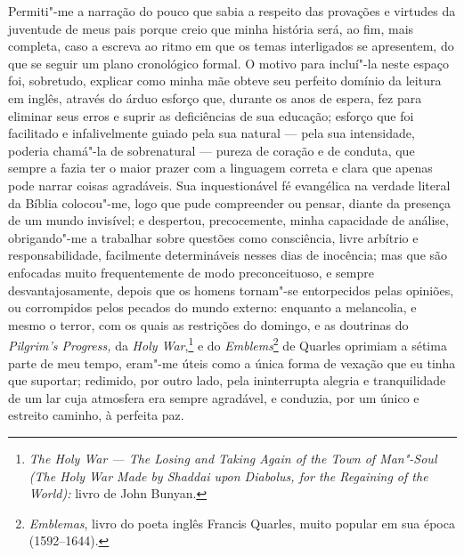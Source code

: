 Permiti"-me a narração do pouco que sabia a respeito das provações e
virtudes da juventude de meus pais porque creio que minha história será,
ao fim, mais completa, caso a escreva ao ritmo em que os temas
interligados se apresentem, do que se seguir um plano cronológico
formal. O motivo para incluí"-la neste espaço foi, sobretudo, explicar
como minha mãe obteve seu perfeito domínio da leitura em inglês, através
do árduo esforço que, durante os anos de espera, fez para eliminar seus
erros e suprir as deficiências de sua educação; esforço que foi
facilitado e infalivelmente guiado pela sua natural --- pela sua
intensidade, poderia chamá"-la de sobrenatural --- pureza de coração e de
conduta, que sempre a fazia ter o maior prazer com a linguagem correta e
clara que apenas pode narrar coisas agradáveis. Sua inquestionável fé
evangélica na verdade literal da Bíblia colocou"-me, logo que pude
compreender ou pensar, diante da presença de um mundo invisível; e
despertou, precocemente, minha capacidade de análise, obrigando"-me a
trabalhar sobre questões como consciência, livre arbítrio e
responsabilidade, facilmente determináveis nesses dias de inocência; mas
que são enfocadas muito frequentemente de modo preconceituoso, e sempre
desvantajosamente, depois que os homens tornam"-se entorpecidos pelas
opiniões, ou corrompidos pelos pecados do mundo externo: enquanto a
melancolia, e mesmo o terror, com os quais as restrições do domingo, e
as doutrinas do \textit{Pilgrim's Progress,} da \textit{Holy War},\footnote{\textit{The
  Holy War --- The Losing and Taking Again of the Town of Man"-Soul (The
  Holy War Made by Shaddai upon Diabolus, for the Regaining of the
  World):} livro de John Bunyan.} e do
\textit{Emblems}\footnote{\textit{Emblemas}, livro do poeta inglês Francis
  Quarles, muito popular em sua época (1592--1644).} de
Quarles oprimiam a sétima parte de meu tempo, eram"-me úteis como a única
forma de vexação que eu tinha que suportar; redimido, por outro lado,
pela ininterrupta alegria e tranquilidade de um lar cuja atmosfera era
sempre agradável, e conduzia, por um único e estreito caminho, à
perfeita paz.

